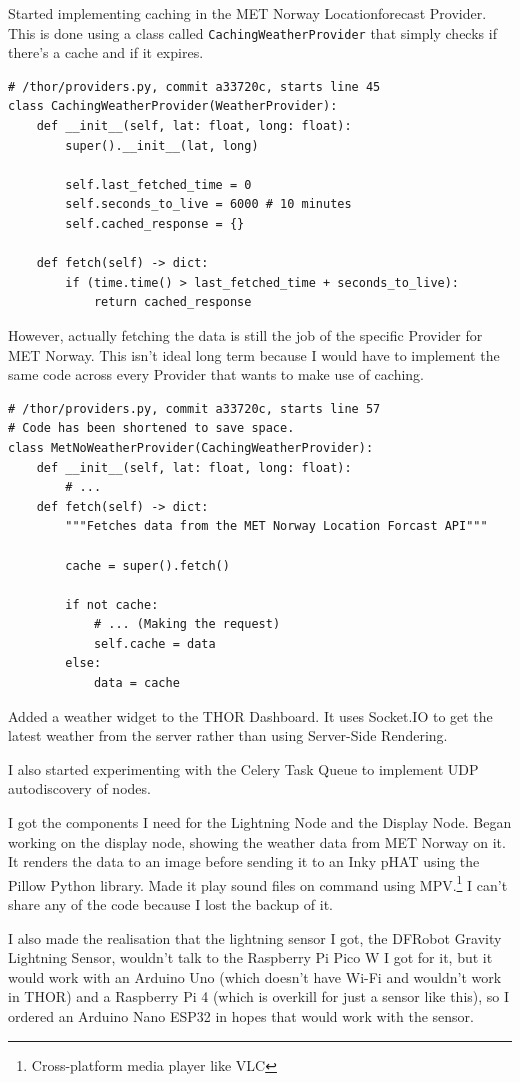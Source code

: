 \documentclass{report}
\begin{document}
	Started implementing caching in the MET Norway Locationforecast Provider. This is done using a class called \texttt{CachingWeatherProvider} that simply checks if there's a cache and if it expires.
	
	\begin{lstlisting}
# /thor/providers.py, commit a33720c, starts line 45
class CachingWeatherProvider(WeatherProvider):
	def __init__(self, lat: float, long: float):
		super().__init__(lat, long)
		
		self.last_fetched_time = 0
		self.seconds_to_live = 6000 # 10 minutes
		self.cached_response = {}
		
	def fetch(self) -> dict:
		if (time.time() > last_fetched_time + seconds_to_live):
			return cached_response
	\end{lstlisting}
	
	However, actually fetching the data is still the job of the specific Provider for MET Norway. This isn't ideal long term because I would have to implement the same code across every Provider that wants to make use of caching.
	
	\begin{lstlisting}
# /thor/providers.py, commit a33720c, starts line 57
# Code has been shortened to save space.
class MetNoWeatherProvider(CachingWeatherProvider):
	def __init__(self, lat: float, long: float):
		# ...
	def fetch(self) -> dict:
		"""Fetches data from the MET Norway Location Forcast API"""
		
		cache = super().fetch()
		
		if not cache:
			# ... (Making the request)
			self.cache = data
		else:
			data = cache
	\end{lstlisting}
	
	Added a weather widget to the THOR Dashboard. It uses Socket.IO to get the latest weather from the server rather than using Server-Side Rendering.
	
	I also started experimenting with the Celery Task Queue to implement UDP autodiscovery of nodes.
	
	I got the components I need for the Lightning Node and the Display Node. Began working on the display node, showing the weather data from MET Norway on it. It renders the data to an image before sending it to an Inky pHAT using the Pillow Python library. Made it play sound files on command using MPV.\footnote{Cross-platform media player like VLC} I can't share any of the code because I lost the backup of it.
	
	I also made the realisation that the lightning sensor I got, the DFRobot Gravity Lightning Sensor, wouldn't talk to the Raspberry Pi Pico W I got for it, but it would work with an Arduino Uno (which doesn't have Wi-Fi and wouldn't work in THOR) and a Raspberry Pi 4 (which is overkill for just a sensor like this), so I ordered an Arduino Nano ESP32 in hopes that would work with the sensor.
		
\end{document}
